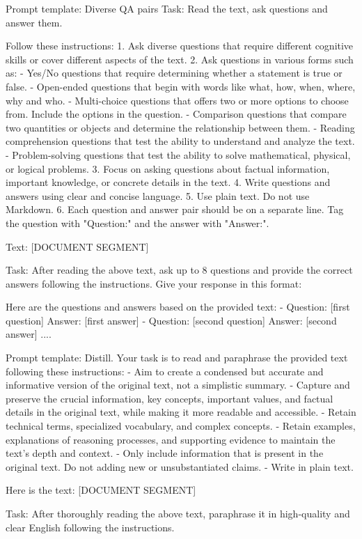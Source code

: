 \documentclass[11pt]{article}
\begin{document}
\begin{table}[!hbt]
\begin{prompt}{Prompt template: Diverse QA pairs}
Task: Read the text, ask questions and answer them.

Follow these instructions:
1. Ask diverse questions that require different cognitive skills or cover different aspects of the text.
2. Ask questions in various forms such as:
  - Yes/No questions that require determining whether a statement is true or false.
  - Open-ended questions that begin with words like what, how, when, where, why and who.
  - Multi-choice questions that offers two or more options to choose from. Include the options in the question.
  - Comparison questions that compare two quantities or objects and determine the relationship between them.
  - Reading comprehension questions that test the ability to understand and analyze the text.
  - Problem-solving questions that test the ability to solve mathematical, physical, or logical problems.
3. Focus on asking questions about factual information, important knowledge, or concrete details in the text.
4. Write questions and answers using clear and concise language.
5. Use plain text. Do not use Markdown.
6. Each question and answer pair should be on a separate line. Tag the question with "Question:" and the answer with "Answer:".

Text:
[DOCUMENT SEGMENT]

Task:
After reading the above text, ask up to 8 questions and provide the correct answers following the instructions. Give your response in this format:

Here are the questions and answers based on the provided text:
- Question: [first question] Answer: [first answer]
- Question: [second question] Answer: [second answer]
....
\end{prompt}
\end{table}

\begin{table}[!hbt]
\begin{prompt}{Prompt template: Distill.}
Your task is to read and paraphrase the provided text following these instructions:
- Aim to create a condensed but accurate and informative version of the original text, not a simplistic summary.
- Capture and preserve the crucial information, key concepts, important values, and factual details in the original text, while making it more readable and accessible.
- Retain technical terms, specialized vocabulary, and complex concepts.
- Retain examples, explanations of reasoning processes, and supporting evidence to maintain the text's depth and context.
- Only include information that is present in the original text. Do not adding new or unsubstantiated claims.
- Write in plain text.

Here is the text:
[DOCUMENT SEGMENT]

Task:
After thoroughly reading the above text, paraphrase it in high-quality and clear English following the instructions.
\end{prompt}
\end{table}
\end{document}

